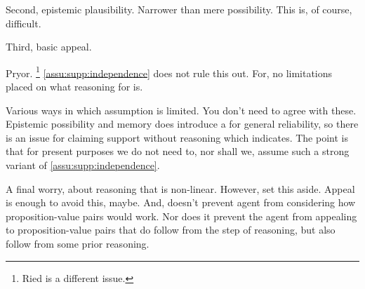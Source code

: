 \begin{note}
  Second, epistemic plausibility.
  Narrower than mere possibility.
  This is, of course, difficult.
\end{note}

\begin{note}
  Third, basic appeal.

  Pryor.\nolinebreak
  \footnote{
    Ried is a different issue.
  }
  \autoref{assu:supp:independence} does not rule this out.
  For, no limitations placed on what reasoning for \requ{} is.
\end{note}

\begin{note}
  Various ways in which assumption is limited.
  You don't need to agree with these.
  Epistemic possibility and memory does introduce a \requ{} for general reliability, so there is an issue for claiming support without reasoning which indicates.
  The point is that for present purposes we do not need to, nor shall we, assume such a strong variant of \autoref{assu:supp:independence}.
\end{note}

\begin{note}
  A final worry, about reasoning that is non-linear.
  However, set this aside.
  Appeal is enough to avoid this, maybe.
  And, doesn't prevent agent from considering how proposition-value pairs would work.
  Nor does it prevent the agent from appealing to proposition-value pairs that do follow from the step of reasoning, but also follow from some prior reasoning.
\end{note}




\hozline


